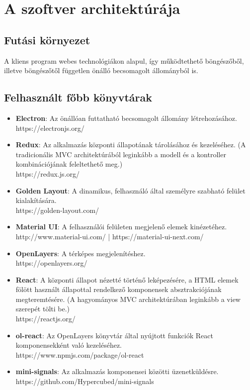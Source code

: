 \section{A szoftver architektúrája}

\subsection{Futási környezet}

A kliens program webes technológiákon alapul, így működtethető böngészőből,
illetve böngészőtől független önálló becsomagolt állományból is.

\subsection{Felhasznált főbb könyvtárak}

\begin{itemize}
  \item \textbf{Electron}: Az önállóan futtatható becsomagolt állomány
  létrehozásához. \\
  https://electronjs.org/

  \item \textbf{Redux}: Az alkalmazás központi állapotának tárolásához és
  kezeléséhez. (A tradicionális MVC architektúrából leginkább a modell és a
  kontroller kombinációjának feleltethető meg.) \\
  https://redux.js.org/

  \item \textbf{Golden Layout}: A dinamikus, felhasználó által személyre szabható
  felület kialakítására. \\
  https://golden-layout.com/

  \item \textbf{Material UI}: A felhasználói felületen megjelenő elemek
  kinézetéhez. \\
  http://www.material-ui.com/ | https://material-ui-next.com/

  \item \textbf{OpenLayers}: A térképes megjelenítéshez. \\
  https://openlayers.org/

  \item \textbf{React}: A központi állapot nézetté történő leképezésére, a HTML
  elemek fölött használt állapottal rendelkező komponensek absztrakciójának
  megteremtésére. (A hagyományos MVC architektúrában leginkább a view szerepét
  tölti be.) \\
  https://reactjs.org/

  \item \textbf{ol-react}: Az OpenLayers könyvtár által nyújtott funkciók React
  komponensekként való kezeléséhez. \\
  https://www.npmjs.com/package/ol-react

  \item \textbf{mini-signals}: Az alkalmazás komponensei közötti üzenetküldésre.
  \\
  https://github.com/Hypercubed/mini-signals
\end{itemize}

